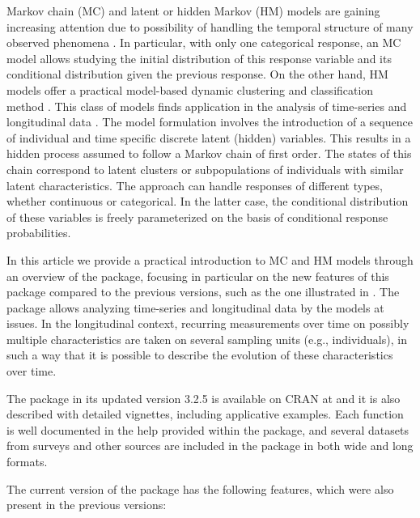 Markov chain (MC) and latent or hidden Markov (HM) models are gaining
increasing attention due to possibility of handling the temporal
structure of many observed phenomena \citep{meyn2012, mor:etal:21}. In
particular, with only one categorical response, an MC model allows
studying the initial distribution of this response variable and its
conditional distribution given the previous response. On the other hand,
HM models offer a practical model-based dynamic clustering and
classification method \citep{bou:et:al:19}. This class of models finds
application in the analysis of time-series \citep{ephr:02, Zucchini2016}
and longitudinal data
\citep{wigg:73, bart:farc:penn:13, bart:pand:penn:22}. The model
formulation involves the introduction of a sequence of individual and
time specific discrete latent (hidden) variables. This results in a
hidden process assumed to follow a Markov chain of first order. The
states of this chain correspond to latent clusters or subpopulations of
individuals with similar latent characteristics. The approach can handle
responses of different types, whether continuous or categorical. In the
latter case, the conditional distribution of these variables is freely
parameterized on the basis of conditional response probabilities.

In this article we provide a practical introduction to MC and HM models
through an overview of the  package, focusing in
particular on the new features of this package compared to the previous
versions, such as the one illustrated in \cite{bart:pand:penn:17}. The
package allows analyzing time-series and longitudinal data by the models
at issues. In the longitudinal context, recurring measurements over time on
possibly multiple characteristics are taken on several sampling units (e.g.,
individuals), in such a way that it is possible to describe the evolution of
these characteristics over time.

The package in its updated version 3.2.5 is available
on CRAN at  and it is also described with detailed
vignettes, including applicative examples. Each function is well
documented in the help provided within the package, and several datasets
from surveys and other sources are included in the package in both wide
and long formats.

The current version of the package has the following features, which
were also present in the previous versions:

